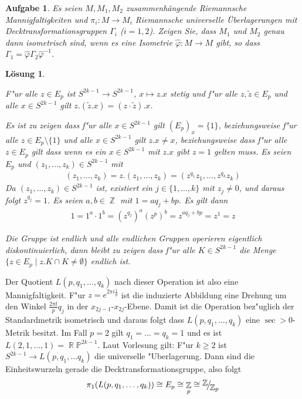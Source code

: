 \documentclass[paper=A4, twoside, chapterprefix=true, bibliography=totoc, headsepline]{scrbook}
\let\temp\phi
\let\phi\varphi
\let\varphi\temp
\let\temp\theta
\let\theta\vartheta
\let\vartheta\temp
\let\temp\epsilon
\let\epsilon\varepsilon
\let\varepsilon\temp
\let\temp\rho
\let\rho\varrho
\let\varrho\temp
\DeclareMathOperator{\R}{\mathbb{R}}
\DeclareMathOperator{\Z}{\mathbb{Z}}
\renewcommand{\P}{\ensuremath{\mathbb{P}}}
\newcommand{\FakRaum}[2]{
	\raisebox{0.7ex}{\ensuremath{#1}}
	\ensuremath{\mkern-3mu}\big/\ensuremath{\mkern-3mu}
	\raisebox{-0.6ex}{\ensuremath{#2}}}
\theoremstyle{plain}
\theoremstyle{nonumberplain}
\theoremstyle{empty}
\theoremstyle{break}
\newtheorem{Aufg}{Aufgabe}
\newtheorem{Loes}{L\"osung}
\begin{document}
\begin{Aufg}
Es seien $M, M_1,M_2$ zusammenhängende Riemannsche Mannigfaltigkeiten und $\pi_i:M \to M_i$ Riemannsche universelle Überlagerungen mit Decktransformationsgruppen $\Gamma_i$ ($i=1,2$). Zeigen Sie, dass $M_1$ und $M_2$ genau dann isometrisch sind, wenn es eine Isometrie $\hat{\phi}:M \to M$ gibt, so dass $\Gamma_1=\hat{\phi} \Gamma_2 \hat{\phi}^{-1}$.
\end{Aufg}

\begin{Loes}\begin{description}[leftmargin=*]
\item[Operation:]
	F"ur alle $z \in E_p$ ist $S^{2k-1} \to S^{2k-1}$, $x \mapsto z.x$ stetig und f"ur alle $z, \tilde z \in E_p$ und alle $x \in S^{2k-1}$ gilt $z.(\tilde z.x) = (z \cdot \tilde z).x$.
\item[Die Operation ist frei:]
	Es ist zu zeigen dass f"ur alle $x \in S^{2k-1}$ gilt $(E_p)_x = \{1\}$, beziehungsweise f"ur alle $z \in E_p \setminus \{1\}$ und alle $x \in S^{2k-1}$ gilt $z.x \ne x$, beziehungsweise dass f"ur alle $z \in E_p$ gilt dass wenn es ein $x \in S^{2k-1}$ mit $z.x$ gibt $z=1$ gelten muss.
	Es seien $E_p$ und $(z_1,\ldots ,z_k) \in S^{2k-1}$ mit
	\begin{align*}
		(z_1,\ldots , z_k) = z.(z_1,\ldots ,z_k) = (z^{q_1} z_1, \ldots , z^{q_k} z_k)
	\end{align*}
	Da $(z_1, \ldots , z_k) \in S^{2k-1}$ ist, existiert ein $j \in \{1, \ldots ,k\}$ mit $z_j \ne 0$, und daraus folgt $z^{q_j} = 1$.
	Es seien $a,b \in \Z$ mit $1 = a q_j + b p$. Es gilt dann
	\begin{align*}
		1 = 1^a \cdot 1^b = (z^{q_j})^a (z^p)^b = z^{a q_j + b p} = z^1 = z
	\end{align*}
\item[Die Operation ist eigentlich kontinuierlich]
	Die Gruppe ist endlich und alle endlichen Gruppen operieren eigentlich diskontinuierlich, dann bleibt zu zeigen dass f"ur alle $K \in S^{2k-1}$ die Menge $\{ z \in E_p \mid z.K \cap K \ne \emptyset \}$ endlich ist.
\end{description}\end{Loes}

Der Quotient $L(p, q_1, \ldots ,q_k)$ nach dieser Operation ist also eine Mannigfaltigkeit.
F"ur $z = e^{2 \pi i \frac{l}{p}}$ ist die induzierte Abbildung eine Drehung um den Winkel $\frac{2 \pi l}{p} q_j$ in der $x_{2j-1}$-$x_{2j}$-Ebene.
Damit ist die Operation bez"uglich der Standardmetrik isometrisch und daraus folgt dass $L(p, q_1, \ldots , q_k)$ eine $\sec > 0$-Metrik besitzt.
Im Fall $p = 2$ gilt $q_1 = \ldots = q_k = 1$ und es ist $L(2, 1, \ldots ,1) = \R\P^{2k-1}$.
Laut Vorlesung gilt: F"ur $k \ge 2$ ist $S^{2k-1} \to L(p, q_1, \ldots  q_k)$ die universelle "Uberlagerung.
Dann sind die Einheitswurzeln gerade die Decktransformationsgruppe, also folgt
\begin{align*}
	\pi_1(L(p, q_1, \ldots ,q_k)) \cong E_p \cong \Z_p \cong \FakRaum{\Z}{\Z_p}
\end{align*}
\end{document}
